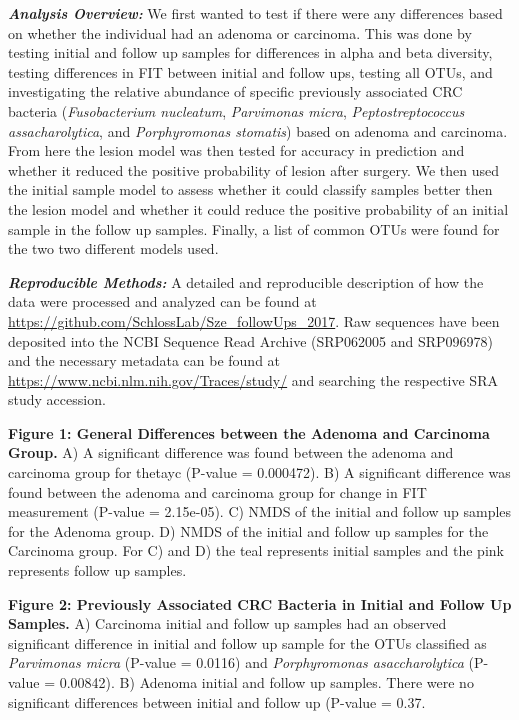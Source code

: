 \documentclass[12pt,]{article}
\begin{document}
\textbf{\emph{Analysis Overview:}} We first wanted to test if there were
any differences based on whether the individual had an adenoma or
carcinoma. This was done by testing initial and follow up samples for
differences in alpha and beta diversity, testing differences in FIT
between initial and follow ups, testing all OTUs, and investigating the
relative abundance of specific previously associated CRC bacteria
(\emph{Fusobacterium nucleatum}, \emph{Parvimonas micra},
\emph{Peptostreptococcus assacharolytica}, and \emph{Porphyromonas
stomatis}) based on adenoma and carcinoma. From here the lesion model
was then tested for accuracy in prediction and whether it reduced the
positive probability of lesion after surgery. We then used the initial
sample model to assess whether it could classify samples better then the
lesion model and whether it could reduce the positive probability of an
initial sample in the follow up samples. Finally, a list of common OTUs
were found for the two two different models used.

\textbf{\emph{Reproducible Methods:}} A detailed and reproducible
description of how the data were processed and analyzed can be found at
\url{https://github.com/SchlossLab/Sze_followUps_2017}. Raw sequences
have been deposited into the NCBI Sequence Read Archive (SRP062005 and
SRP096978) and the necessary metadata can be found at
\url{https://www.ncbi.nlm.nih.gov/Traces/study/} and searching the
respective SRA study accession.

\newpage

\textbf{Figure 1: General Differences between the Adenoma and Carcinoma
Group.} A) A significant difference was found between the adenoma and
carcinoma group for thetayc (P-value = 0.000472). B) A significant
difference was found between the adenoma and carcinoma group for change
in FIT measurement (P-value = 2.15e-05). C) NMDS of the initial and
follow up samples for the Adenoma group. D) NMDS of the initial and
follow up samples for the Carcinoma group. For C) and D) the teal
represents initial samples and the pink represents follow up samples.

\textbf{Figure 2: Previously Associated CRC Bacteria in Initial and
Follow Up Samples.} A) Carcinoma initial and follow up samples had an
observed significant difference in initial and follow up sample for the
OTUs classified as \emph{Parvimonas micra} (P-value = 0.0116) and
\emph{Porphyromonas asaccharolytica} (P-value = 0.00842). B) Adenoma
initial and follow up samples. There were no significant differences
between initial and follow up (P-value = 0.37.
\end{document}
